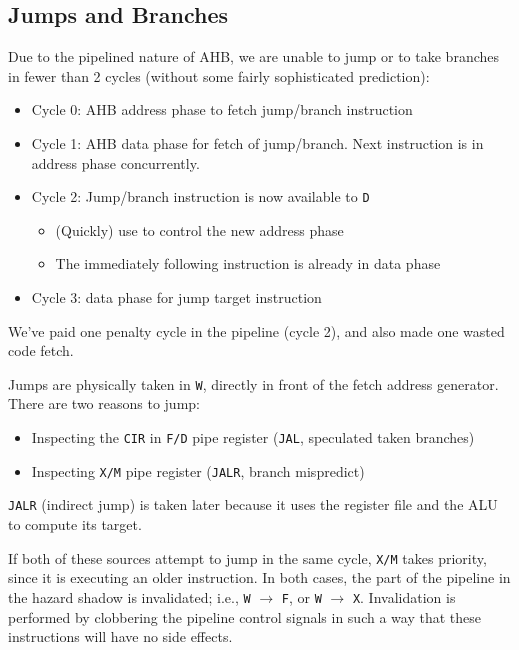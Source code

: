 \documentclass{article}
\begin{document}
\subsection{Jumps and Branches}

Due to the pipelined nature of AHB, we are unable to jump or to take branches in fewer than 2 cycles (without some fairly sophisticated prediction):

\begin{itemize}
\item Cycle 0: AHB address phase to fetch jump/branch instruction
\item Cycle 1: AHB data phase for fetch of jump/branch. Next instruction is in address phase concurrently.
\item Cycle 2: Jump/branch instruction is now available to \texttt{D}
	\begin{itemize}
		\item (Quickly) use to control the new address phase
		\item The immediately following instruction is already in data phase
	\end{itemize}
\item Cycle 3: data phase for jump target instruction
\end{itemize}


We've paid one penalty cycle in the pipeline (cycle 2), and also made one wasted code fetch.

Jumps are physically taken in \texttt{W}, directly in front of the fetch address generator. There are two reasons to jump:

\begin{itemize}
	\item Inspecting the \texttt{CIR} in \texttt{F/D} pipe register (\texttt{JAL}, speculated taken branches)
	\item Inspecting \texttt{X/M} pipe register (\texttt{JALR}, branch mispredict)
\end{itemize}

\texttt{JALR} (indirect jump) is taken later because it uses the register file and the ALU to compute its target.

If both of these sources attempt to jump in the same cycle, \texttt{X/M} takes priority, since it is executing an older instruction. In both cases, the part of the pipeline in the hazard shadow is invalidated; i.e., \texttt{W} $\to$ \texttt{F}, or \texttt{W} $\to$ \texttt{X}. Invalidation is performed by clobbering the pipeline control signals in such a way that these instructions will have no side effects.
\end{document}
